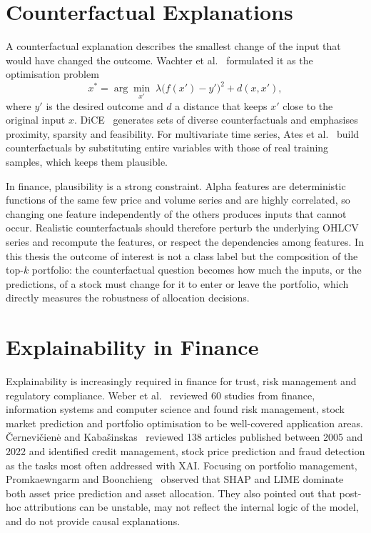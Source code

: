 \section{Counterfactual Explanations}
\label{sec:rw_counterfactual}

A counterfactual explanation describes the smallest change of the input that would have changed the outcome. Wachter et al.~\cite{wachter2018counterfactual} formulated it as the optimisation problem
\begin{equation}
    \label{eq:rw_counterfactual}
    x^{\ast} = \arg\min_{x'} \; \lambda \big(f(x') - y'\big)^2 + d(x, x'),
\end{equation}
where $y'$ is the desired outcome and $d$ a distance that keeps $x'$ close to the original input $x$. DiCE~\cite{mothilal2020explaining} generates sets of diverse counterfactuals and emphasises proximity, sparsity and feasibility. For multivariate time series, Ates et al.~\cite{ates2021counterfactual} build counterfactuals by substituting entire variables with those of real training samples, which keeps them plausible.

In finance, plausibility is a strong constraint. Alpha features are deterministic functions of the same few price and volume series and are highly correlated, so changing one feature independently of the others produces inputs that cannot occur. Realistic counterfactuals should therefore perturb the underlying OHLCV series and recompute the features, or respect the dependencies among features. In this thesis the outcome of interest is not a class label but the composition of the top-$k$ portfolio: the counterfactual question becomes how much the inputs, or the predictions, of a stock must change for it to enter or leave the portfolio, which directly measures the robustness of allocation decisions.

\section{Explainability in Finance}
\label{sec:rw_finance}

Explainability is increasingly required in finance for trust, risk management and regulatory compliance. Weber et al.~\cite{weber2024applications} reviewed 60 studies from finance, information systems and computer science and found risk management, stock market prediction and portfolio optimisation to be well-covered application areas. {\v{C}}ernevi{\v{c}}ien{\.{e}} and Kaba{\v{s}}inskas~\cite{cerneviciene2024explainable} reviewed 138 articles published between 2005 and 2022 and identified credit management, stock price prediction and fraud detection as the tasks most often addressed with XAI. Focusing on portfolio management, Promkaewngarm and Boonchieng~\cite{promkaewngarm2025explainable} observed that SHAP and LIME dominate both asset price prediction and asset allocation. They also pointed out that post-hoc attributions can be unstable, may not reflect the internal logic of the model, and do not provide causal explanations.

